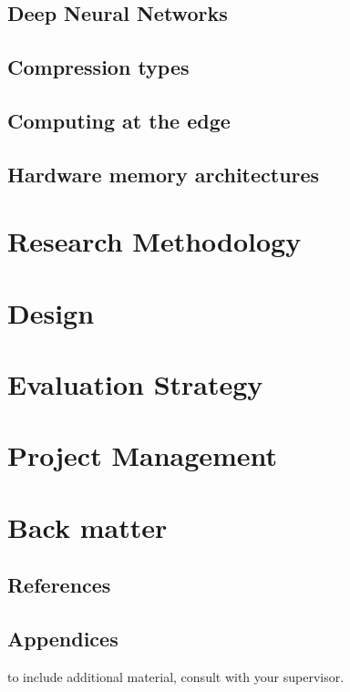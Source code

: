 \documentclass[11pt]{article}
\begin{document}
\subsection{Deep Neural Networks}\label{subsec:deepLearning}


\subsection{Compression types}\label{subsec:compressionTypes}


\subsection{Computing at the edge}\label{subsec:edgeComputing}


\subsection{Hardware memory architectures}\label{subsec:hardwareArch}


\pagebreak
\section{Research Methodology}


\pagebreak
\section{Design}


\pagebreak
\section{Evaluation Strategy}


\pagebreak
\section{Project Management}


\pagebreak
\appendix
\section{Back matter}
\subsection{References}
\printbibliography

\subsection{Appendices}
to include additional material, consult with your supervisor.

\printnoidxglossary[type=acronym]
\printacronyms
\end{document}
